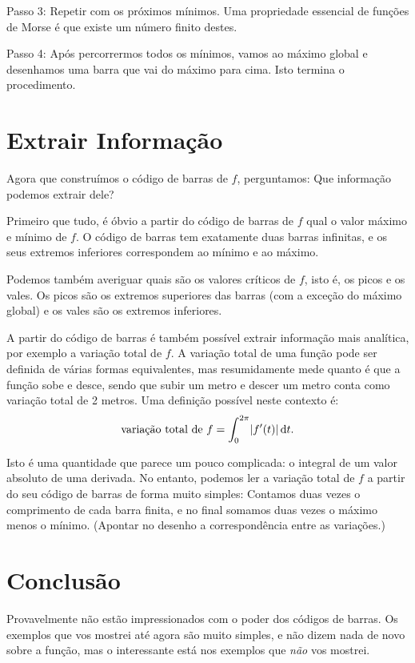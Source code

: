 \documentclass[12pt]{article}
\theoremstyle{nonumberplain}
\DeclarePairedDelimiter{\abs}{\lvert}{\rvert}
\begin{document}
Passo 3: Repetir com os próximos mínimos. Uma propriedade essencial de funções de Morse é que existe um número finito destes.

Passo 4: Após percorrermos todos os mínimos, vamos ao máximo global e desenhamos uma barra que vai do máximo para cima. Isto termina o procedimento.



\section{Extrair Informação}

Agora que construímos o código de barras de $f$, perguntamos: Que informação podemos extrair dele?

Primeiro que tudo, é óbvio a partir do código de barras de $f$ qual o valor máximo e mínimo de $f$. O código de barras tem exatamente duas barras infinitas, e os seus extremos inferiores correspondem ao mínimo e ao máximo.

Podemos também averiguar quais são os valores críticos de $f$, isto é, os picos e os vales. Os picos são os extremos superiores das barras (com a exceção do máximo global) e os vales são os extremos inferiores.

A partir do código de barras é também possível extrair informação mais analítica, por exemplo a variação total de $f$. A variação total de uma função pode ser definida de várias formas equivalentes, mas resumidamente mede quanto é que a função sobe e desce, sendo que subir um metro e descer um metro conta como variação total de 2 metros. Uma definição possível neste contexto é:
\[\text{variação total de $f$} = \int_0^{2\pi} \abs{f'(t)} \dl t.\]

Isto é uma quantidade que parece um pouco complicada: o integral de um valor absoluto de uma derivada. No entanto, podemos ler a variação total de $f$ a partir do seu código de barras de forma muito simples: Contamos duas vezes o comprimento de cada barra finita, e no final somamos duas vezes o máximo menos o mínimo. (Apontar no desenho a correspondência entre as variações.)


\section{Conclusão}

Provavelmente não estão impressionados com o poder dos códigos de barras. Os exemplos que vos mostrei até agora são muito simples, e não dizem nada de novo sobre a função, mas o interessante está nos exemplos que \emph{não} vos mostrei.
\end{document}
